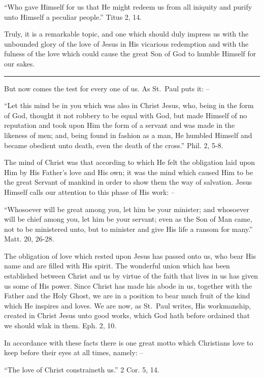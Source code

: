 \documentclass[
]{book}
\begin{document}
``Who gave Himself for us that He might redeem us from all iniquity and purify unto Himself a peculiar people.'' Titus 2, 14.

Truly, it is a remarkable topic, and one which should duly impress us with the unbounded glory of the love of Jesus in His vicarious redemption and with the fulness of the love which could cause the great Son of God to humble Himself for our sakes.

\begin{center}\rule{0.5\linewidth}{0.5pt}\end{center}

But now comes the test for every one of us. As St.~Paul puts it: --

``Let this mind be in you which was also in Christ Jesus, who, being in the form of God, thought it not robbery to be equal with God, but made Himself of no reputation and took upon Him the form of a servant and was made in the likeness of men; and, being found in fashion as a man, He humbled Himself and became obedient unto death, even the death of the cross.'' Phil. 2, 5-8.

The mind of Christ was that according to which He felt the obligation laid upon Him by His Father's love and His own; it was the mind which caused Him to be the great Servant of mankind in order to show them the way of salvation. Jesus Himself calls our attention to this phase of His work: --

``Whosoever will be great among you, let him be your minister; and whosoever will be chief among you, let him be your servant; even as the Son of Man came, not to be ministered unto, but to minister and give His life a ransom for many.'' Matt. 20, 26-28.

The obligation of love which rested upon Jesus has passed onto us, who bear His name and are filled with His spirit. The wonderful union which has been established between Christ and us by virtue of the faith that lives in us has given us some of His power. Since Christ has made his abode in us, together with the Father and the Holy Ghost, we are in a position to bear much fruit of the kind which He inspires and loves. We are now, as St.~Paul writes, His workmanship, created in Christ Jesus unto good works, which God hath before ordained that we should wlak in them. Eph. 2, 10.

In accordance with these facts there is one great motto which Christians love to keep before their eyes at all times, namely: --

``The love of Christ constraineth us.'' 2 Cor. 5, 14.
\end{document}
